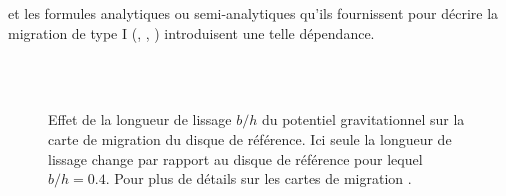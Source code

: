 \cite{paardekooper2010torque, paardekooper2011torque} et les formules analytiques ou semi-analytiques qu'ils fournissent pour
décrire la migration de type I (, ,
) introduisent une telle dépendance. 

\begin{figure}[htb]
\centering
{}\hfill
{}\\
\hfill
{}\\
\caption{Effet de la longueur de lissage $b/h$ du potentiel gravitationnel sur la carte de migration du disque de référence. Ici seule la longueur de lissage change par rapport au disque de référence \protect{} pour lequel $b/h=0.4$.  Pour plus de détails sur les cartes de migration \protect{}.}\label{fig:migration_map_smoothing}
\end{figure}


